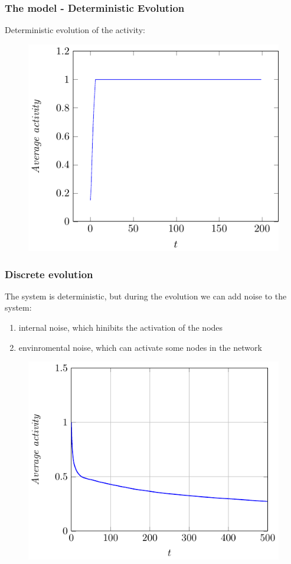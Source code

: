 \documentclass{beamer}
\begin{document}
\begin{frame}
\frametitle{The model - Deterministic Evolution}
Deterministic evolution of the activity:
\begin{figure}
\includegraphics[scale = 0.8]{images/det.pdf}
\end{figure}
\end{frame}


\begin{frame}
\frametitle{Discrete evolution}
The system is deterministic, but during the evolution we can add noise to the system:
\begin{enumerate}
\item internal noise, which hinibits the activation of the nodes
\item envinromental noise, which can activate some nodes in the network
\end{enumerate}

\begin{figure}
\includegraphics[scale = 0.6]{images/n.pdf}
\end{figure}
\end{frame}
\end{document}
